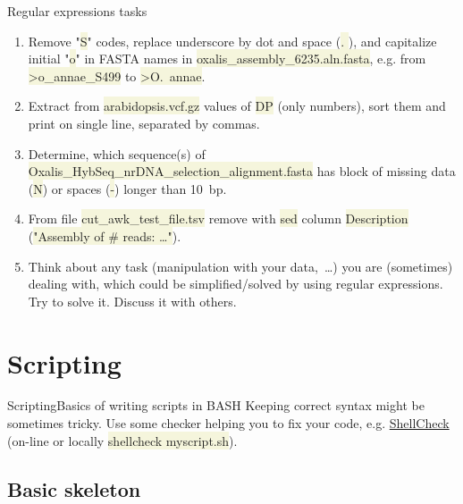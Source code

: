 \documentclass[compress, xelatex, 11pt, xcolor=svgnames, aspectratio=169, url={hyphens, lowtilde}]{beamer}
\renewcommand{\texttt}[1]{\colorbox{Beige}{{\ttfamily #1}}}
\begin{document}
\begin{frame}[fragile]{Regular expressions tasks}
	\begin{enumerate}
		\item Remove "\texttt{S}" codes, replace underscore by dot and space (\texttt{. }), and capitalize initial "\texttt{o}" in FASTA names in \texttt{oxalis\_assembly\_6235.aln.fasta}, e.g. from \texttt{>o\_annae\_S499} to \texttt{>O.~annae}.
		\item Extract from \texttt{arabidopsis.vcf.gz} values of \texttt{DP} (only numbers), sort them and print on single line, separated by commas.
		\item Determine, which sequence(s) of \texttt{Oxalis\_HybSeq\_nrDNA\_selection\_alignment.fasta} has block of missing data (\texttt{N}) or spaces (\texttt{-}) longer than 10~bp.
		\item From file \texttt{cut\_awk\_test\_file.tsv} remove with \texttt{sed} column \texttt{Description} (\texttt{"Assembly of \# reads: \ldots "}).
		\item Think about any task (manipulation with your data,~\ldots) you are (sometimes) dealing with, which could be simplified/solved by using regular expressions. Try to solve it. Discuss it with others.
	\end{enumerate}
\end{frame}

\section{Scripting} %

\begin{frame}{Scripting}{Basics of writing scripts in BASH}
	\tableofcontents[currentsection, sectionstyle=show/hide, hideothersubsections]
	Keeping correct syntax might be sometimes tricky. Use some checker helping you to fix your code, e.g. \href{https://www.shellcheck.net/}{ShellCheck} (on-line or locally \texttt{shellcheck myscript.sh}).
\end{frame}

\subsection{Basic skeleton}
\end{document}
